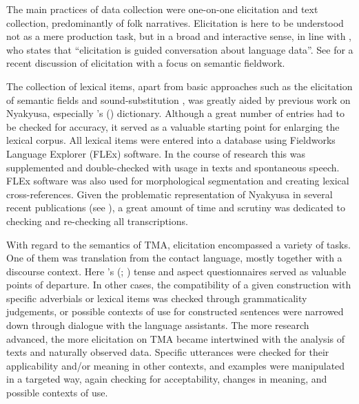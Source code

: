 The main practices of data collection were one-on-one elicitation and text collection, predominantly of folk narratives. Elicitation is here to be understood not as a mere production task, but in a broad and interactive sense, in line with \citet[2]{MousM2007}, who states that ``elicitation is guided conversation about language data''. See \citet[245--256]{CoverR2015} for a recent discussion of elicitation with a focus on semantic fieldwork.

The collection of lexical items, apart from basic approaches such as the elicitation of semantic fields and sound-substitution \citep[104--111]{CrowleyT2007}, was greatly aided by previous work on Nyakyusa, especially \citeauthor{FelbergK1996}'s (\citeyear{FelbergK1996}) dictionary. Although a great number of entries had to be checked for accuracy, it served as a valuable starting point for enlarging the lexical corpus. All lexical items were entered into a database using Fieldworks Language Explorer (FLEx) software. In the course of research this was supplemented and double-checked with usage in texts and spontaneous speech. FLEx software was also used for morphological segmentation and creating lexical cross-references. Given the problematic representation of Nyakyusa in several recent publications (see ), 
a great amount of time and scrutiny was dedicated to checking and re-checking all transcriptions.

With regard to the semantics of TMA, elicitation encompassed a variety of tasks. One of them was translation from the contact language, mostly together with a discourse context. Here \citeauthor{DahlOe1985}'s (\citeyear{DahlOe1985}; \citeyear{DahlOe2000a}) tense and aspect questionnaires served as valuable points of departure. In other cases, the compatibility of a given construction with specific adverbials or lexical items was checked through grammaticality judgements, or possible contexts of use for constructed sentences were narrowed down through dialogue with the language assistants. The more research advanced, the more elicitation on TMA became intertwined with the analysis of texts and naturally observed data. Specific utterances were checked for their applicability and/or meaning in other contexts, and examples were manipulated in a targeted way, again checking for acceptability, changes in meaning, and possible contexts of use.

